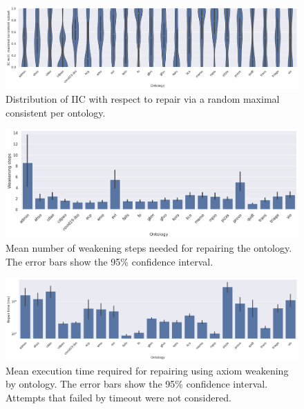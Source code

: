\begin{figure}[ht]
    \begin{widepage}
      \centering
      \includegraphics[width=\textwidth]{resources/iic-mcs-ontology-violin.png}
    \end{widepage}
    \caption{Distribution of IIC with respect to repair via a random maximal consistent per ontology.}
\end{figure}

\begin{figure}[ht]
  \begin{widepage}
    \centering
    \includegraphics[width=\textwidth]{resources/steps-ontology-bar.png}
  \end{widepage}
  \caption{Mean number of weakening steps needed for repairing the ontology. The error bars show the 95\% confidence interval.}
\end{figure}

\begin{figure}[ht]
  \begin{widepage}
    \centering
    \includegraphics[width=\textwidth]{resources/time-ontology-bar.png}
  \end{widepage}
  \caption{Mean execution time required for repairing using axiom weakening by ontology. The error bars show the 95\% confidence interval. Attempts that failed by timeout were not considered.}
\end{figure}

